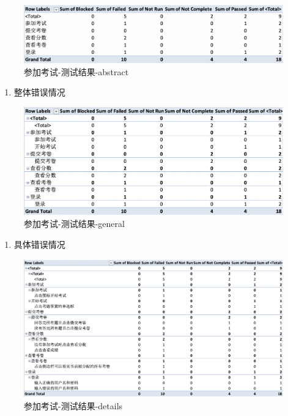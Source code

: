 \documentclass[hyperref, a4paper]{ctexart}
\providecommand{\tightlist}{%
  \setlength{\itemsep}{0pt}\setlength{\parskip}{0pt}}
\begin{document}
\begin{figure}
\centering
\includegraphics{screenshoots/PivotTable_abstract_3.png}
\caption{参加考试-测试结果-abstract}
\end{figure}

\begin{enumerate}
\def\labelenumi{\arabic{enumi}.}
\setcounter{enumi}{1}
\tightlist
\item
  整体错误情况
\end{enumerate}

\begin{figure}
\centering
\includegraphics{screenshoots/PivotTable_general_3.png}
\caption{参加考试-测试结果-general}
\end{figure}

\begin{enumerate}
\def\labelenumi{\arabic{enumi}.}
\setcounter{enumi}{2}
\tightlist
\item
  具体错误情况
\end{enumerate}

\begin{figure}
\centering
\includegraphics{screenshoots/PivotTable_Details_3.png}
\caption{参加考试-测试结果-details}
\end{figure}
\end{document}
